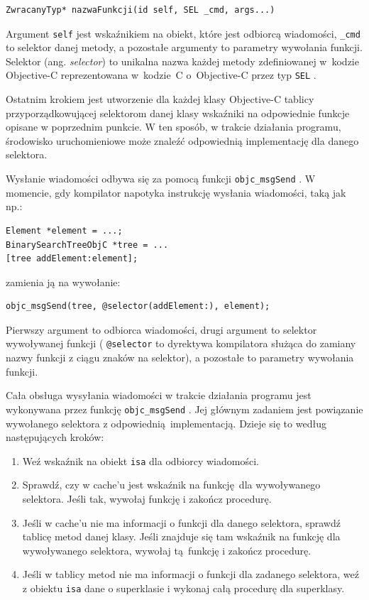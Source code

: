 \documentclass[mgr, shortabstract]{iithesis}
\newcommand{\ang}[1]{ang. \textit{#1}}
\newcommand{\objcinline}[1]{
    \texttt{#1}
}
\begin{document}
\begin{verbatim}
ZwracanyTyp* nazwaFunkcji(id self, SEL _cmd, args...)
\end{verbatim}

Argument \objcinline{self} jest wskaźnikiem na obiekt, które jest odbiorcą wiadomości, \objcinline{_cmd} to selektor danej metody, a pozostałe argumenty to parametry wywołania funkcji. Selektor (\ang{selector}) to unikalna nazwa każdej metody zdefiniowanej w~kodzie Objective-C reprezentowana w~kodzie~C o~Objective-C przez typ \objcinline{SEL}.

Ostatnim krokiem jest utworzenie dla każdej klasy Objective-C tablicy przyporządkowującej selektorom danej klasy wskaźniki na odpowiednie funkcje opisane w poprzednim punkcie. W ten sposób, w trakcie działania programu, środowisko uruchomieniowe może znaleźć odpowiednią implementację dla danego selektora.

Wysłanie wiadomości odbywa się za pomocą funkcji \objcinline{objc_msgSend}. W momencie, gdy kompilator napotyka instrukcję wysłania wiadomości, taką jak np.:

\begin{verbatim}
Element *element = ...;
BinarySearchTreeObjC *tree = ...
[tree addElement:element];
\end{verbatim}

zamienia ją na wywołanie:

\begin{verbatim}
objc_msgSend(tree, @selector(addElement:), element);
\end{verbatim}

Pierwszy argument to odbiorca wiadomości, drugi argument to selektor wywoływanej funkcji (\objcinline{@selector} to dyrektywa kompilatora służąca do zamiany nazwy funkcji z ciągu znaków na selektor), a pozostałe to parametry wywołania funkcji.

Cała obsługa wysyłania wiadomości w trakcie działania programu jest wykonywana przez funkcję \objcinline{objc_msgSend}. Jej głównym zadaniem jest powiązanie wywołanego selektora z odpowiednią implementacją. Dzieje się to według następujących kroków:

\begin{enumerate}
    \item Weź wskaźnik na obiekt \objcinline{isa} dla odbiorcy wiadomości.
    \item Sprawdź, czy w cache'u jest wskaźnik na funkcję dla wywoływanego selektora. Jeśli tak, wywołaj funkcję i zakończ procedurę.
    \item Jeśli w cache'u nie ma informacji o funkcji dla danego selektora, sprawdź tablicę metod danej klasy. Jeśli znajduje się tam wskaźnik na funkcję dla wywoływanego selektora, wywołaj tą funkcję i zakończ procedurę.
    \item Jeśli w tablicy metod nie ma informacji o funkcji dla zadanego selektora, weź z obiektu \objcinline{isa} dane o superklasie i wykonaj całą procedurę dla superklasy.
\end{enumerate}
\end{document}
